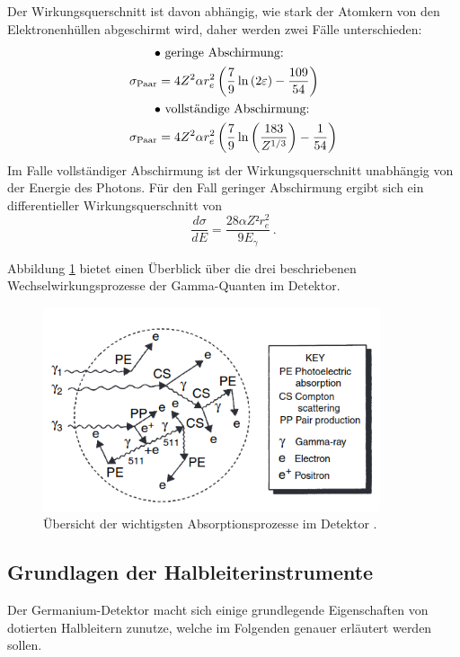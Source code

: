 Der Wirkungsquerschnitt ist davon abhängig, wie stark der Atomkern von den Elektronenhüllen abgeschirmt wird, daher werden zwei Fälle unterschieden:
\begin{align}
\intertext{$\qquad\bullet$ geringe Abschirmung: } \sigma_{\text{Paar}}&=4Z^2 \alpha r_e^2 \left(\frac{7}{9}\ln\left(2\varepsilon\right)-\frac{109}{54}\right)\\
\intertext{$\qquad\bullet$ vollständige Abschirmung: } \sigma_{\text{Paar}}&=4Z^2 \alpha r_e^2 \left(\frac{7}{9}\ln\left(\frac{183}{Z^{1/3}}\right)-\frac{1}{54}\right)
\end{align}
Im Falle vollständiger Abschirmung ist der Wirkungsquerschnitt unabhängig von der Energie des Photons.
Für den Fall geringer Abschirmung ergibt sich ein differentieller Wirkungsquerschnitt von
\begin{equation}
\frac{d\sigma}{d E} = \frac{28\alpha Z² r_e^2}{9E_{\gamma}}\, .
\end{equation}

Abbildung \ref{fig:tfig5} bietet einen Überblick über die drei beschriebenen Wechselwirkungsprozesse der Gamma-Quanten im Detektor.

\FloatBarrier
\begin{figure}
\centering
\includegraphics[height=6cm]{alles.png}
\caption{Übersicht der wichtigsten Absorptionsprozesse im Detektor \cite{quelle02}.}
\label{fig:tfig5}
\end{figure}
\FloatBarrier

\subsection{Grundlagen der Halbleiterinstrumente}
Der Germanium-Detektor macht sich einige grundlegende Eigenschaften von dotierten Halbleitern zunutze, welche im Folgenden genauer erläutert werden sollen.

